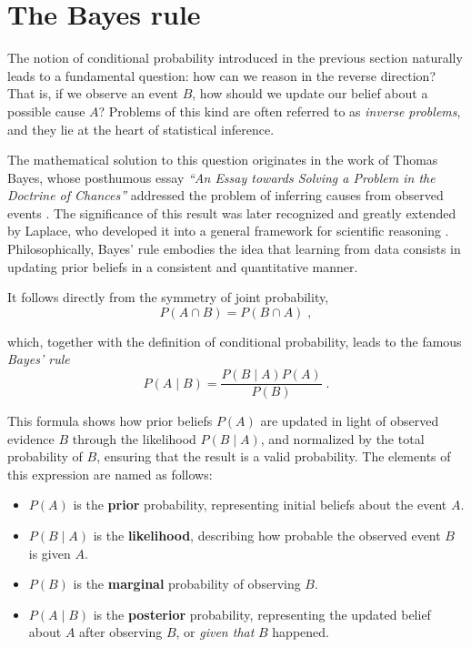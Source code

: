 \section{The Bayes rule}

The notion of conditional probability introduced in the previous section naturally leads to a fundamental question: how can we reason in the reverse direction? That is, if we observe an event $B$, how should we update our belief about a possible cause $A$? Problems of this kind are often referred to as \emph{inverse problems}, and they lie at the heart of statistical inference.

\medskip

The mathematical solution to this question originates in the work of Thomas Bayes, whose posthumous essay \textit{``An Essay towards Solving a Problem in the Doctrine of Chances''} addressed the problem of inferring causes from observed events \cite{bayes_1763_doctrine}. The significance of this result was later recognized and greatly extended by Laplace, who developed it into a general framework for scientific reasoning \cite{laplace_1812_theorie}. Philosophically, Bayes’ rule embodies the idea that learning from data consists in updating prior beliefs in a consistent and quantitative manner.

\medskip

It follows directly from the symmetry of joint probability,
\begin{equation}
    P(A \cap B) = P(B \cap A) \; ,
\end{equation}

which, together with the definition of conditional probability, leads to the famous \textit{Bayes' rule}
\begin{equation}
    P(A \mid B) = \frac{P(B \mid A)P(A)}{P(B)} \; .
\end{equation}

This formula shows how prior beliefs $P(A)$ are updated in light of observed evidence $B$ through the likelihood $P(B \mid A)$, and normalized by the total probability of $B$, ensuring that the result is a valid probability. The elements of this expression are named as follows:

\begin{itemize}
    \item{$P(A)$ is the \textbf{prior} probability, representing initial beliefs about the event $A$.}
    \item{$P(B \mid A)$ is the \textbf{likelihood}, describing how probable the observed event $B$ is given $A$.}
    \item{$P(B)$ is the \textbf{marginal} probability of observing $B$.}
    \item{$P(A \mid B)$ is the \textbf{posterior} probability, representing the updated belief about $A$ after observing $B$, or \textit{given that} $B$ happened.}
\end{itemize}

